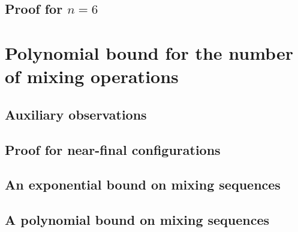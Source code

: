 \documentclass[a4paper,UKenglish]{lipics-v2018}
\begin{document}

\subsection{Proof for $n=6$}
\label{subsec: proof for n equal 6}



\section{Polynomial bound for the number of mixing operations}
\label{sec: polynomial proof}



\subsection{Auxiliary observations}
\label{sec: polynomial - auxiliary observations}



\subsection{Proof for near-final configurations}
\label{sec: polynomial - near final}



\subsection{An exponential bound on mixing sequences}
\label{sec: an exponential bound}



\subsection{A polynomial bound on mixing sequences}
\label{sec: polynomial - arbitrary n}

\end{document}
